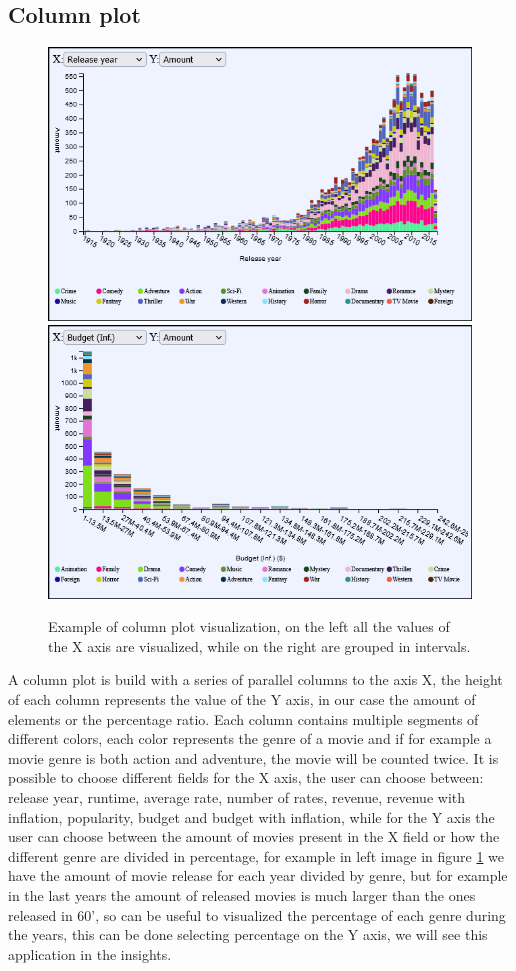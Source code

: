 \documentclass[]{article}
\begin{document}
\subsection{Column plot}
\begin{figure}
	\centering
	\includegraphics[width=0.49\linewidth]{images/column_plot}
	\includegraphics[width=0.49\linewidth]{images/column_plot1}
	\caption{Example of column plot visualization, on the left all the values of the X axis are visualized, while on the right are grouped in intervals.}
	\label{fig:columnplot}
\end{figure}
A column plot is build with a series of parallel columns to the axis X, the height of each column represents the value of the Y axis, in our case the amount of elements or the percentage ratio.\newline
Each column contains multiple segments of different colors, each color represents the genre of a movie and if for example a movie genre is both action and adventure, the movie will be counted twice.\newline
It is possible to choose different fields for the X axis, the user can choose between: release year, runtime, average rate, number of rates, revenue, revenue with inflation, popularity, budget and budget with inflation, while for the Y axis the user can choose between the amount of movies present in the X field or how the different genre are divided in percentage, for example in left image in figure \ref{fig:columnplot} we have the amount of movie release for each year divided by genre, but for example in the last years the amount of released movies is much larger than the ones released in 60', so can be useful to visualized the percentage of each genre during the years, this can be done selecting percentage on the Y axis, we will see this application in the insights.\newline
\end{document}
